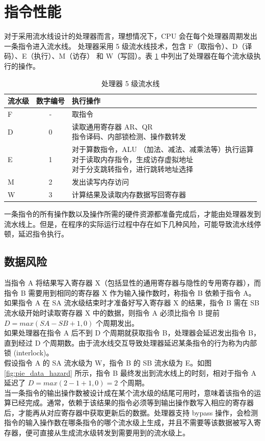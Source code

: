 \documentclass[main\_\_CN.tex]{subfiles}
\begin{document}


\section{指令性能}\label{subsec:pie_pipeline}
对于采用流水线设计的处理器而言，理想情况下，CPU 会在每个处理器周期发出一条指令进入流水线。\chipname{} 处理器采用 5 级流水线技术，包含 F（取指令）、D（译码）、E（执行）、M（访存） 和 W（写回）。表 \ref{tab:pie_processor_5stage} 中列出了处理器在每个流水级执行的操作。\\

\begin{longtable}[c]{|l|c|l|}
    \caption{\chipname{} 处理器 5 级流水线}
    \label{tab:pie_processor_5stage}\\
    \hline
    \rowcolor{lightgray}
    \textbf{流水级} & \textbf{数字编号} & \textbf{执行操作} \\\hline
    F & - & 取指令 \\\hline
    D & 0 & \makecell[l]{读取通用寄存器 AR、QR \\ 指令译码、内部锁检测、操作数转发}\\\hline
    E & 1 & \makecell[l]{对于算数指令，ALU （加法、减法、减乘法等）执行运算\\对于读取内存指令，生成访存虚拟地址\\对于分支跳转指令，进行跳转地址选择}\\\hline
    M & 2 & 发出读写内存访问 \\\hline
    W & 3 & 计算结果及读取内存数据写回寄存器\\\hline
\end{longtable}

一条指令的所有操作数以及操作所需的硬件资源都准备完成后，才能由处理器发到流水线上。但是，在程序的实际运行过程中存在如下几种风险，可能导致流水线停顿，延迟指令执行。

\subsection{数据风险}
当指令 A 将结果写入寄存器 X（包括显性的通用寄存器与隐性的专用寄存器），而指令 B 需要用到相同的寄存器 X 作为输入操作数时，称指令 B 依赖于指令 A。如果指令 A 在 SA 流水级结束时才准备好写入寄存器 X 的结果，指令 B 需在 SB 流水级开始时读取寄存器 X 中的数据，则指令 A 必须比指令 B 提前 $D = max(SA - SB + 1, 0)$ 个周期发出。\\
如果处理器在指令 A 后不到 D 个周期就获取指令 B，处理器会延迟发出指令 B，直到经过 D 个周期数。由于流水线交互导致处理器延迟某条指令的行为称为内部锁 (interlock)。\\
假设指令 A 的 SA 流水级为 W，指令 B 的 SB 流水级为 E。如图 \ref{fig:pie_data_hazard} 所示，指令 B 最终发出到流水线上的时刻，相对于指令 A 延迟了 $D = max(2 - 1 + 1, 0) = 2$ 个周期。\\
当一条指令的输出操作数被设计成在某个流水级的结尾可用时，意味着该指令的运算已经完成。通常，依赖于该结果的指令必须等到输出操作数写入相应的寄存器后，才能再从对应寄存器中获取更新后的数据。处理器支持 bypass 操作，会检测指令的输入操作数在哪条指令的哪个流水级上生成，并且不需要等该数据被写入寄存器，便可直接从生成流水级转发到需要用到的流水级上。
\end{document}

